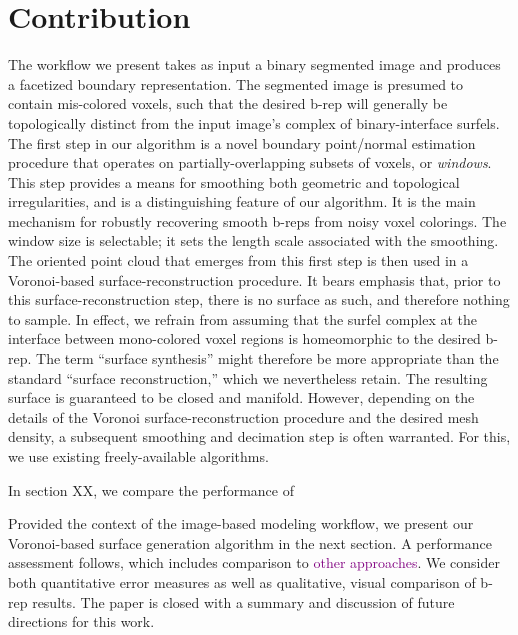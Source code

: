 \section{Contribution}

The workflow we present takes as input a binary segmented image and produces a facetized boundary representation.  The segmented image is presumed to contain mis-colored voxels, such that the desired b-rep will generally be topologically distinct from the input image's complex of binary-interface surfels.  The first step in our algorithm is a novel boundary point/normal estimation procedure that operates on partially-overlapping subsets of voxels, or {\em windows}.  This step provides a means for smoothing both geometric and topological irregularities, and is a distinguishing feature of our algorithm.  It is the main mechanism for robustly recovering smooth b-reps from noisy voxel colorings.  The window size is selectable; it sets the length scale associated with the smoothing.  The oriented point cloud that emerges from this first step is then used in a Voronoi-based surface-reconstruction procedure.  It bears emphasis that, prior to this surface-reconstruction step, there is no surface as such, and therefore nothing to sample.  In effect, we refrain from assuming that the surfel complex at the interface between mono-colored voxel regions is homeomorphic to the desired b-rep.  The term ``surface synthesis'' might therefore be more appropriate than the standard ``surface reconstruction,'' which we nevertheless retain. The resulting surface is guaranteed to be closed and manifold.  However, depending on the details of the Voronoi surface-reconstruction procedure and the desired mesh density, a subsequent smoothing and decimation step is often warranted.  For this, we use existing freely-available algorithms.

In section XX, we compare the performance of 




Provided the context of the image-based modeling workflow, we present our Voronoi-based surface generation algorithm in the next section. A performance assessment follows, which includes comparison to \textcolor{purple}{other approaches}.  We consider both quantitative error measures as well as qualitative, visual comparison of b-rep results.  The paper is closed with a summary and discussion of future directions for this work.